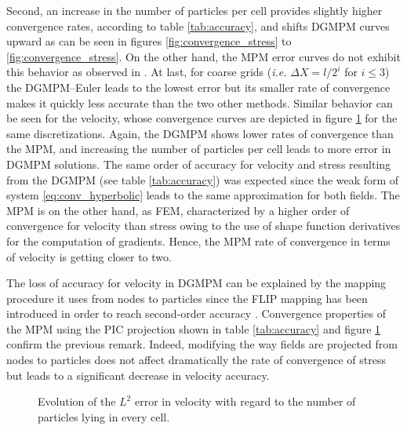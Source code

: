 Second, an increase in the number of particles per cell provides slightly higher convergence rates, according to table \ref{tab:accuracy}, and shifts DGMPM curves upward as can be seen in figures \ref{fig:convergence_stress} to \ref{fig:convergence_stress}.
On the other hand, the MPM error curves do not exhibit this behavior as observed in \cite{MPM_BSpline1}.
At last, for coarse grids (\textit{i.e.} $\Delta X= l/2^i$ for $i \leq 3$) the DGMPM--Euler leads to the lowest error but its smaller rate of convergence makes it quickly less accurate than the two other methods.
Similar behavior can be seen for the velocity, whose convergence curves are depicted in figure \ref{fig:convergence_velocity} for the same discretizations.
Again, the DGMPM shows lower rates of convergence than the MPM, and increasing the number of particles per cell leads to more error in DGMPM solutions.
The same order of accuracy for velocity and stress resulting from the DGMPM (see table \ref{tab:accuracy}) was expected since the weak form of system \eqref{eq:conv_hyperbolic} leads to the same approximation for both fields.
The MPM is on the other hand, as FEM, characterized by a higher order of convergence for velocity than stress owing to the use of shape function derivatives for the computation of gradients.
Hence, the MPM rate of convergence in terms of velocity is getting closer to two. 

The loss of accuracy for velocity in DGMPM can be explained by the mapping procedure it uses from nodes to particles since the FLIP mapping has been introduced in order to reach second-order accuracy \cite{PIC_Nishiguchi}.
Convergence properties of the MPM using the PIC projection shown in table \ref{tab:accuracy} and figure \ref{fig:convergence_velocity} confirm the previous remark.
Indeed, modifying the way fields are projected from nodes to particles does not affect dramatically the rate of convergence of stress but leads to a significant decrease in velocity accuracy.
\begin{figure}[h!]
  \centering
  {\label{subfig:convV_2ppc}}
  {\label{subfig:convV_6ppc}}
  {\label{subfig:convV_10ppc}}
  {\label{subfig:convV_20ppc}}
  \caption{Evolution of the $L^2$ error in velocity with regard to the number of particles lying in every cell.}
  \label{fig:convergence_velocity}
\end{figure}

